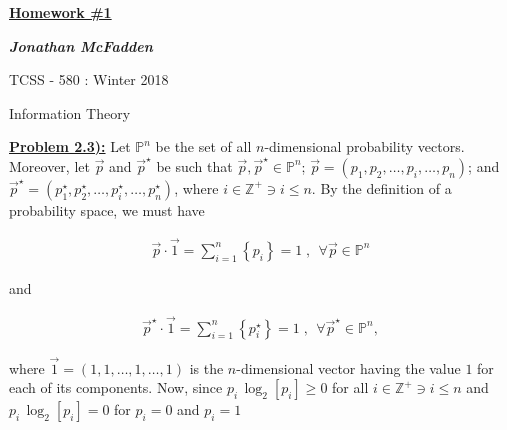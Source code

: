 \documentclass{article}[12pt]
\numberwithin{equation}{subsection}
\newcommand{\prob}[1]{\textbf{\underline{Problem #1):}}}
\begin{document}
\begin{center}
	\begin{Huge}
		\textbf{ \underline{Homework \#1} }
	\end{Huge}
\end{center}

\vspace{0.1in}

\begin{center}
	\begin{Large}
		\textbf{\emph{Jonathan McFadden}}
	\end{Large}
\end{center}

\vspace{0.2in}

\begin{center}
	\begin{large}
		TCSS - 580  :  Winter 2018 \\
	\end{large}
	Information Theory
\end{center}

\vspace{1.0in}



\begin{flushleft}



\prob{2.3}  Let $\mathbb{P}^n$ be the set of all $n$-dimensional probability vectors.  Moreover, let $\vec{p}$ and $\vec{p}^\star$ be such that $\vec{p}, \vec{p}^\star \in \mathbb{P}^n$; $\vec{p} = \left( p_1, p_2, \dots, p_i, \dots, p_n \right)$; and $\vec{p}^\star = \left( p_1^\star, p_2^\star, \dots, p_i^\star, \dots, p_n^\star \right)$, where $i \in \mathbb{Z}^+ \ni i \leq n$.  By the definition of a probability space, we must have

\begin{align*}
\vec{p} \cdot \vec{1} = \sum_{i=1}^n \left\{ p_i \right\} = 1  \; , \; \, \forall \vec{p} \in \mathbb{P}^n
\end{align*}

and

\begin{align*}
\vec{p}^\star \cdot \vec{1} = \sum_{i=1}^n \left\{ p_i^\star \right\} = 1  \; , \; \, \forall \vec{p}^\star \in \mathbb{P}^n,
\end{align*}

where $\vec{1} = \left( 1, 1, \dots, 1, \dots, 1 \right)$ is the $n$-dimensional vector having the value $1$ for each of its components.  Now, since $p_i \, \log_2 \left[ p_i \right] \geq 0$ for all $i \in \mathbb{Z}^+ \ni i \leq n$ and $p_i \, \log_2 \left[ p_i \right] = 0$ for $p_i = 0$ and $p_i = 1$











\end{flushleft}
\end{document}
